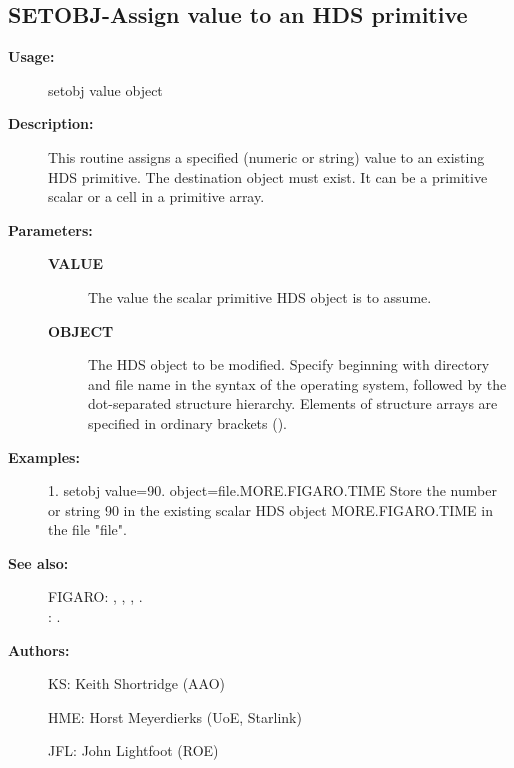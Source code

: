 \subsection{SETOBJ-\label{SETOBJ}Assign value to an HDS primitive}
\begin{description}

\item [\textbf{Usage:}]
 setobj value object

\item [\textbf{Description:}]
 This routine assigns a specified (numeric or string) value to an
 existing HDS primitive. The destination object must exist. It can
 be a primitive scalar or a cell in a primitive array.

\item [\textbf{Parameters:}]
\begin{description}
\item [\textbf{VALUE}]
 The value the scalar primitive HDS object is to assume.
\item [\textbf{OBJECT}]
 The HDS object to be modified. Specify beginning with directory
 and file name in the syntax of the operating system, followed by
 the dot-separated structure hierarchy. Elements of structure
 arrays are specified in ordinary brackets ().
\end{description}

\item [\textbf{Examples:}]
\begin{terminalv}
 1.  setobj value=90. object=file.MORE.FIGARO.TIME
   Store the number or string 90 in the existing scalar HDS
   object MORE.FIGARO.TIME in the file "file".

\end{terminalv}

\item [\textbf{See also:}]
FIGARO: , , , .\\
: .\\

\item [\textbf{Authors:}]
 KS: Keith Shortridge (AAO)

 HME: Horst Meyerdierks (UoE, Starlink)

 JFL: John Lightfoot (ROE)
\end{description}
